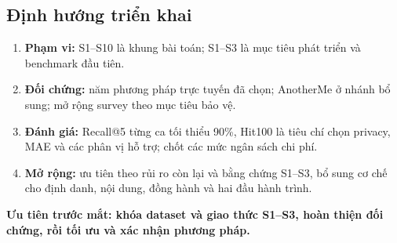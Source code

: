 \documentclass[10pt,a4paper]{article}
\newcommand{\key}[1]{\par\smallskip\noindent\colorbox{pale}{\parbox{\dimexpr\linewidth-2\fboxsep}{\textbf{#1}}}\par\smallskip}
\begin{document}
\subsection{Định hướng triển khai}
\begin{enumerate}
\item \textbf{Phạm vi:} S1--S10 là khung bài toán; S1--S3 là mục tiêu phát triển và benchmark đầu tiên.
\item \textbf{Đối chứng:} năm phương pháp trực tuyến đã chọn; AnotherMe ở nhánh bổ sung; mở rộng survey theo mục tiêu bảo vệ.
\item \textbf{Đánh giá:} Recall@5 từng ca tối thiểu 90\%, Hit100 là tiêu chí chọn privacy, MAE và các phân vị hỗ trợ; chốt các mức ngân sách chi phí.
\item \textbf{Mở rộng:} ưu tiên theo rủi ro còn lại và bằng chứng S1--S3, bổ sung cơ chế cho định danh, nội dung, đồng hành và hai đầu hành trình.
\end{enumerate}
\key{Ưu tiên trước mắt: khóa dataset và giao thức S1--S3, hoàn thiện đối chứng, rồi tối ưu và xác nhận phương pháp.}

\newpage
\end{document}
